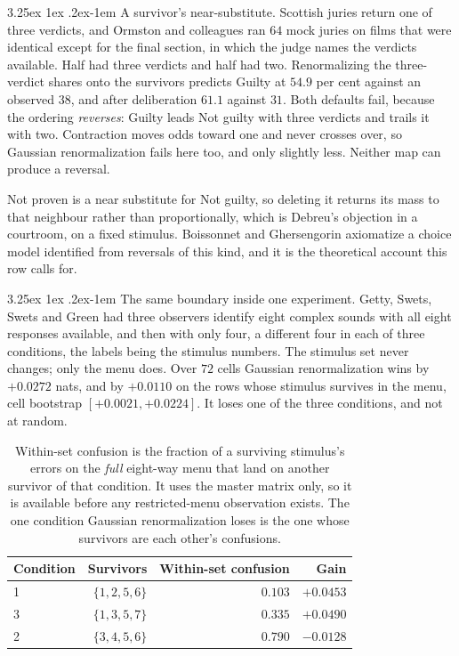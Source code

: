 \documentclass[11pt]{article}
\makeatletter
\theoremstyle{italichead}
\renewcommand\paragraph{\@startsection{paragraph}{4}{\z@}%
  {3.25ex \@plus1ex \@minus.2ex}{-1em}%
  {\normalfont\normalsize\itshape}}
\makeatother
\begin{document}
\paragraph{A survivor's near-substitute.} Scottish juries return one of three verdicts, and
Ormston and colleagues \cite{ormston2019} ran $64$ mock juries on films that were identical
except for the final section, in which the judge names the verdicts available. Half had
three verdicts and half had two. Renormalizing the three-verdict shares onto the survivors
predicts Guilty at $54.9$ per cent against an observed $38$, and after deliberation $61.1$
against $31$. Both defaults fail, because the ordering \emph{reverses}: Guilty leads Not
guilty with three verdicts and trails it with two. Contraction moves odds toward one and
never crosses over, so Gaussian renormalization fails here too, and only slightly less. Neither
map can produce a reversal.

Not proven is a near substitute for Not guilty, so deleting it returns its mass to that
neighbour rather than proportionally, which is Debreu's objection in a courtroom, on a fixed
stimulus. Boissonnet and Ghersengorin \cite{boissonnet2025} axiomatize a choice model identified
from reversals of this kind, and it is the theoretical account this row calls for.

\paragraph{The same boundary inside one experiment.} Getty, Swets, Swets and Green
\cite{getty1979} had three observers identify eight complex sounds with all eight responses
available, and then with only four, a different four in each of three conditions, the labels
being the stimulus numbers. The stimulus set never changes; only the menu does. Over $72$
cells Gaussian renormalization wins by $+0.0272$ nats, and by $+0.0110$ on the rows whose stimulus survives
in the menu, cell bootstrap $[+0.0021, +0.0224]$. It loses one of the three conditions, and not
at random.

\begin{table}[htbp]
\centering
\small
\begin{tabular}{lrrr}
\toprule
Condition & Survivors & Within-set confusion & Gain \\
\midrule
1 & $\{1,2,5,6\}$ & $0.103$ & $+0.0453$ \\
3 & $\{1,3,5,7\}$ & $0.335$ & $+0.0490$ \\
2 & $\{3,4,5,6\}$ & $0.790$ & $-0.0128$ \\
\bottomrule
\end{tabular}
\caption{Within-set confusion is the fraction of a surviving stimulus's errors on the
\emph{full} eight-way menu that land on another survivor of that condition. It uses the
master matrix only, so it is available before any restricted-menu observation exists. The one condition Gaussian renormalization loses is the one whose survivors are each other's confusions.}
\label{tab:getty}
\end{table}
\end{document}
